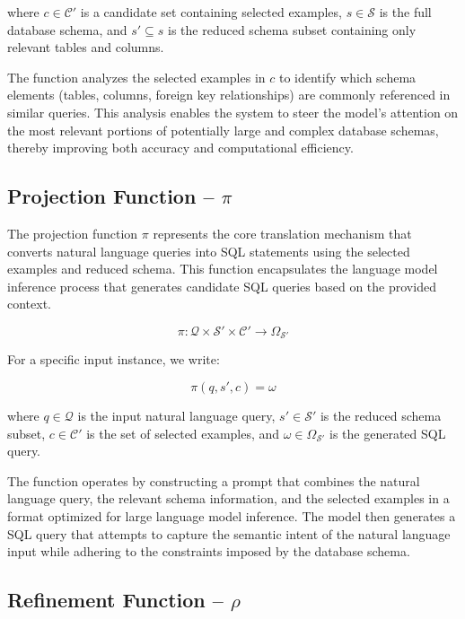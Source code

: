 \vspace{0.5em}

where $c \in \mathcal{C}'$ is a candidate set containing selected examples, $s \in \mathcal{S}$
is the full database schema, and $s' \subseteq s$ is the reduced schema subset containing
only relevant tables and columns.

The function analyzes the selected examples in $c$ to identify which schema elements
(tables, columns, foreign key relationships) are commonly referenced in similar queries.
This analysis enables the system to steer the model's attention on the most relevant
portions of potentially large and complex database schemas, thereby improving both accuracy
and computational efficiency.

\subsection{Projection Function – $\pi$}

The projection function $\pi$ represents the core translation mechanism that converts
natural language queries into SQL statements using the selected examples and reduced schema.
This function encapsulates the language model inference process that generates candidate
SQL queries based on the provided context.

$$
\pi: \mathcal{Q} \times \mathcal{S}' \times \mathcal{C}' \rightarrow \Omega_{\mathcal{S}'}
$$

\vspace{0.5em}

For a specific input instance, we write:

$$
\pi(q, s', c) = \omega
$$

\vspace{0.5em}

where $q \in \mathcal{Q}$ is the input natural language query, $s' \in \mathcal{S}'$ is
the reduced schema subset, $c \in \mathcal{C}'$ is the set of selected examples,
and $\omega \in \Omega_{\mathcal{S}'}$ is the generated SQL query.

The function operates by constructing a prompt that combines the natural language
query, the relevant schema information, and the selected examples in a format
optimized for large language model inference. The model then generates a SQL query
that attempts to capture the semantic intent of the natural language input while
adhering to the constraints imposed by the database schema.


\subsection{Refinement Function – $\rho$}

